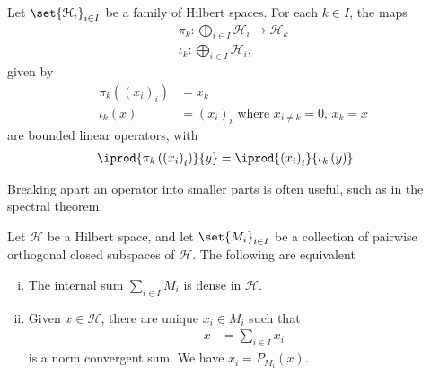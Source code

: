 \documentclass[10pt]{mypackage}
\begin{document}
\begin{lemma}
  Let $\set{\mathcal{H}_{i}}_{i\in I}$ be a family of Hilbert spaces. For each $k\in I$, the maps
  \begin{align*}
    \pi_k\colon \bigoplus_{i\in I}\mathcal{H}_i \rightarrow \mathcal{H}_k\\
    \iota_k\colon \bigoplus_{i\in I}\mathcal{H}_i,
  \end{align*}
  given by
  \begin{align*}
    \pi_k\left(\left(x_i\right)_i\right) &= x_k\\
    \iota_k\left(x\right) &= \left(x_i\right)_i\text{ where $x_{i\neq k} = 0$, $x_k = x$}
  \end{align*}
  are bounded linear operators, with
  \begin{align*}
    \iprod{\pi_k\left(\left(x_i\right)_i\right)}{y} &= \iprod{\left(x_i\right)_i}{\iota_k\left(y\right)}.
  \end{align*}
\end{lemma}
Breaking apart an operator into smaller parts is often useful, such as in the spectral theorem.
\begin{proposition}
  Let $\mathcal{H}$ be a Hilbert space, and let $\set{M_i}_{i\in I}$ be a collection of pairwise orthogonal closed subspaces of $\mathcal{H}$. The following are equivalent
  \begin{enumerate}[(i)]
    \item The internal sum $\sum_{i\in I}M_i$ is dense in $\mathcal{H}$.
    \item Given $x\in \mathcal{H}$, there are unique $x_i\in M_i$ such that
      \begin{align*}
        x &= \sum_{i\in I}x_i
      \end{align*}
      is a norm convergent sum. We have $x_i = P_{M_i}\left(x\right)$.
  \end{enumerate}
\end{proposition}
\end{document}
